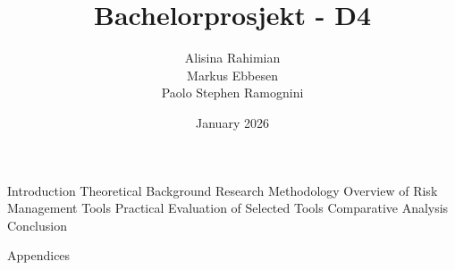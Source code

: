 \documentclass{article}
\title{Bachelorprosjekt - D4}
\author{Alisina Rahimian \\
        Markus Ebbesen \\
        Paolo Stephen Ramognini}
\date{January 2026}
\begin{document}
\maketitle

\newpage \tableofcontents \newpage
{Introduction} \clearpage
{Theoretical Background} \clearpage
{Research Methodology} \clearpage
{Overview of Risk Management Tools} \clearpage
{Practical Evaluation of Selected Tools} \clearpage
{Comparative Analysis} \clearpage
{Conclusion} \clearpage

\newpage
\printbibliography[heading = bibintoc, title = Bibliography] 

{Appendices}
\end{document}
